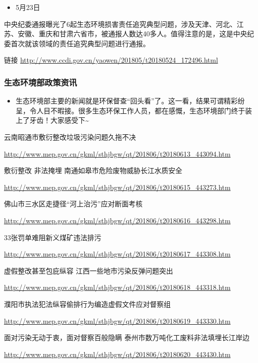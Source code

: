 \documentclass[]{book}
\providecommand{\tightlist}{%
  \setlength{\itemsep}{0pt}\setlength{\parskip}{0pt}}
\begin{document}
\begin{itemize}
\tightlist
\item
  5月23日
\end{itemize}

中央纪委通报曝光了6起生态环境损害责任追究典型问题，涉及天津、河北、江苏、安徽、重庆和甘肃六省市，被通报人数达40多人。值得注意的是，这是中央纪委首次就该领域的责任追究典型问题进行通报。

链接 \url{http://www.ccdi.gov.cn/yaowen/201805/t20180524_172496.html}

\subsubsection*{生态环境部政策资讯}\label{-2}

\begin{itemize}
\tightlist
\item
  生态环境部主要的新闻就是环保督查``回头看''了。这一看，结果可谓精彩纷呈，令人目不暇接。很多生态环保工作人员，都在感慨，生态环境部门终于装上了牙齿！大家感受下\textasciitilde{}
\end{itemize}

云南昭通市敷衍整改垃圾污染问题久拖不决

\url{http://www.mep.gov.cn/gkml/sthjbgw/qt/201806/t20180613_443094.htm}

敷衍整改 非法掩埋 南通如皋市危险废物威胁长江水质安全

\url{http://www.mep.gov.cn/gkml/sthjbgw/qt/201806/t20180615_443273.htm}

佛山市三水区走捷径``河上治污''应对断面考核

\url{http://www.mep.gov.cn/gkml/sthjbgw/qt/201806/t20180616_443298.htm}

33张罚单难阻新义煤矿违法排污

\url{http://www.mep.gov.cn/gkml/sthjbgw/qt/201806/t20180617_443308.htm}

虚假整改甚至包庇纵容 江西一些地市污染反弹问题突出

\url{http://www.mep.gov.cn/gkml/sthjbgw/qt/201806/t20180618_443318.htm}

濮阳市执法犯法纵容偷排行为编造虚假文件应对督察组

\url{http://www.mep.gov.cn/gkml/sthjbgw/qt/201806/t20180619_443330.htm}

面对污染无动于衷，面对督察百般隐瞒 泰州市数万吨化工废料非法填埋长江岸边

\url{http://www.mep.gov.cn/gkml/sthjbgw/qt/201806/t20180620_443430.htm}
\end{document}
